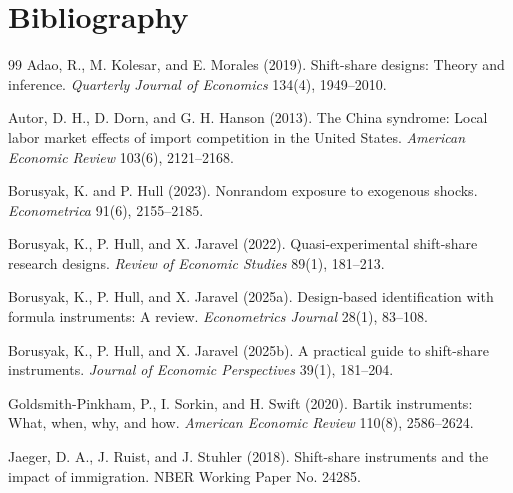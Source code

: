 \documentclass[11pt]{article}
\theoremstyle{definition}
\theoremstyle{plain}
\theoremstyle{remark}
\begin{document}
\section*{Bibliography}
\begin{thebibliography}{99}
Adao, R., M. Kolesar, and E. Morales (2019).
Shift-share designs: Theory and inference.
\emph{Quarterly Journal of Economics} 134(4), 1949--2010.

Autor, D. H., D. Dorn, and G. H. Hanson (2013).
The China syndrome: Local labor market effects of import competition in the United States.
\emph{American Economic Review} 103(6), 2121--2168.

Borusyak, K. and P. Hull (2023).
Nonrandom exposure to exogenous shocks.
\emph{Econometrica} 91(6), 2155--2185.

Borusyak, K., P. Hull, and X. Jaravel (2022).
Quasi-experimental shift-share research designs.
\emph{Review of Economic Studies} 89(1), 181--213.

Borusyak, K., P. Hull, and X. Jaravel (2025a).
Design-based identification with formula instruments: A review.
\emph{Econometrics Journal} 28(1), 83--108.

Borusyak, K., P. Hull, and X. Jaravel (2025b).
A practical guide to shift-share instruments.
\emph{Journal of Economic Perspectives} 39(1), 181--204.

Goldsmith-Pinkham, P., I. Sorkin, and H. Swift (2020).
Bartik instruments: What, when, why, and how.
\emph{American Economic Review} 110(8), 2586--2624.

Jaeger, D. A., J. Ruist, and J. Stuhler (2018).
Shift-share instruments and the impact of immigration.
NBER Working Paper No. 24285.
\end{thebibliography}
\end{document}
